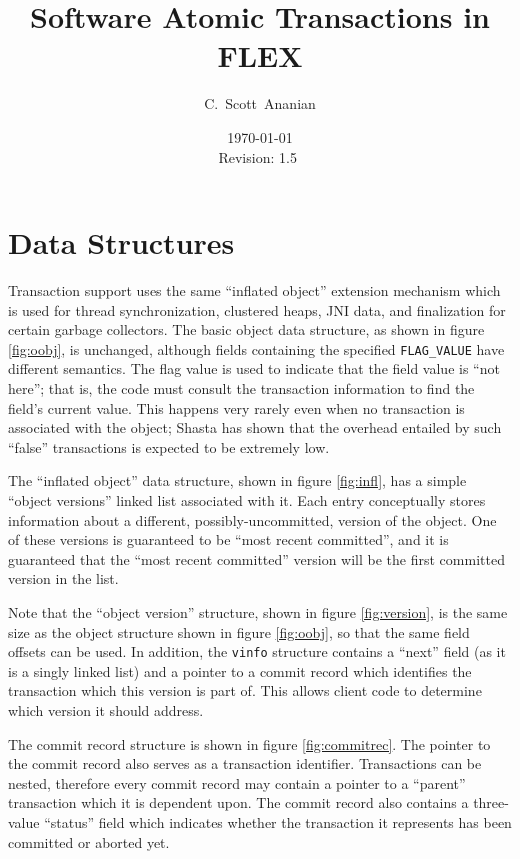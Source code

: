 \documentclass[11pt,notitlepage]{article}
\author{C.~Scott~Ananian}
\title{Software Atomic Transactions in FLEX}
\date{\today \\ $ $Revision: 1.5 $ $}
\begin{document}

\maketitle
\section{Data Structures}

Transaction support uses the same ``inflated object'' extension
mechanism which is used for thread synchronization, clustered heaps,
JNI data, and finalization for certain garbage collectors.
The basic object data structure, as shown in figure \ref{fig:oobj}, is
unchanged, although fields containing the specified
\texttt{FLAG\_VALUE} have different semantics.  The flag value is used
to indicate that the field value is ``not here''; that is, the code
must consult the transaction information to find the field's current
value.  This happens very rarely even when no transaction is
associated with the object; Shasta \cite{scales96:shasta} has shown that the
overhead entailed by such ``false'' transactions is expected to be
extremely low.

The ``inflated object'' data structure, shown in figure
\ref{fig:infl}, has a simple ``object versions'' linked list associated with
it.  Each entry conceptually stores information about a different,
possibly-uncommitted, version of the object.  One of these versions is
guaranteed to be ``most recent committed'', and it is guaranteed that
the ``most recent committed'' version will be the first committed
version in the list.

Note that the ``object version'' structure, shown in figure
\ref{fig:version}, is the same size as the object structure shown in
figure \ref{fig:oobj}, so that the same field offsets can be used.
In addition, the \texttt{vinfo} structure contains a ``next'' field
(as it is a singly linked list) and a pointer to a commit record which
identifies the transaction which this version is part of.  This allows
client code to determine which version it should address.

The commit record structure is shown in figure \ref{fig:commitrec}.
The pointer to the commit record also serves as a transaction
identifier.  Transactions can be nested, therefore every commit record
may contain a pointer to a ``parent'' transaction which it is
dependent upon.  The commit record also contains a three-value
``status'' field which indicates whether the transaction it represents
has been committed or aborted yet.
\end{document}
